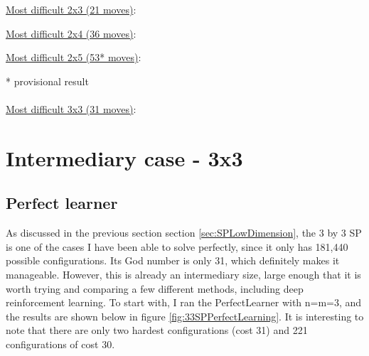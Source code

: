\underline{Most difficult 2x3 (21 moves)}:
\begin{center}
\begin{five}
\end{five}
\end{center}
\underline{Most difficult 2x4 (36 moves)}:
\begin{center}
\begin{seven}
\end{seven}
\end{center}
\underline{Most difficult 2x5 (53* moves)}:
\begin{center}
\begin{nine}
\end{nine}
\end{center}
* provisional result
\\
\\
\underline{Most difficult 3x3 (31 moves)}:
\begin{center}
\begin{eight}
\end{eight}
\end{center}



\section{Intermediary case - 3x3}
\label{sec:S33}


\subsection{Perfect learner}
As discussed in the previous section section \ref{sec:SPLowDimension}, the 3 by 3 SP is one of the cases I have been able to solve perfectly, since it only has 181,440 possible configurations. Its God number is only 31, which definitely makes it manageable. However, this is already an intermediary size, large enough that it is worth trying and comparing a few different methods, including deep reinforcement learning. To start with, I ran the PerfectLearner with n=m=3, and the results are shown below in figure \ref{fig:33SPPerfectLearning}. It is interesting to note that there are only two hardest configurations (cost 31) and 221 configurations of cost 30.


